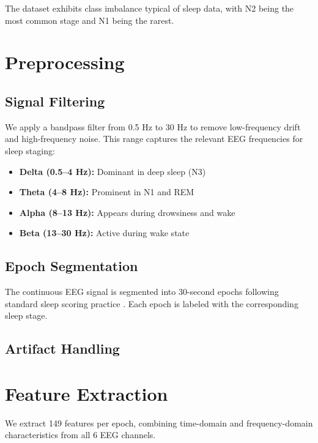 The dataset exhibits class imbalance typical of sleep data, with N2 being the most common stage and N1 being the rarest.

\section{Preprocessing}
\label{sec:preprocessing}

\subsection{Signal Filtering}
\label{subsec:filtering}

We apply a bandpass filter from 0.5 Hz to 30 Hz to remove low-frequency drift and high-frequency noise. This range captures the relevant EEG frequencies for sleep staging:

\begin{itemize}
    \item \textbf{Delta (0.5--4 Hz):} Dominant in deep sleep (N3)
    \item \textbf{Theta (4--8 Hz):} Prominent in N1 and REM
    \item \textbf{Alpha (8--13 Hz):} Appears during drowsiness and wake
    \item \textbf{Beta (13--30 Hz):} Active during wake state
\end{itemize}

\subsection{Epoch Segmentation}
\label{subsec:segmentation}

The continuous EEG signal is segmented into 30-second epochs following standard sleep scoring practice \cite{TODO_ADD_AASM}. Each epoch is labeled with the corresponding sleep stage.

\subsection{Artifact Handling}
\label{subsec:artifacts}


\section{Feature Extraction}
\label{sec:feature_extraction}

We extract 149 features per epoch, combining time-domain and frequency-domain characteristics from all 6 EEG channels.

